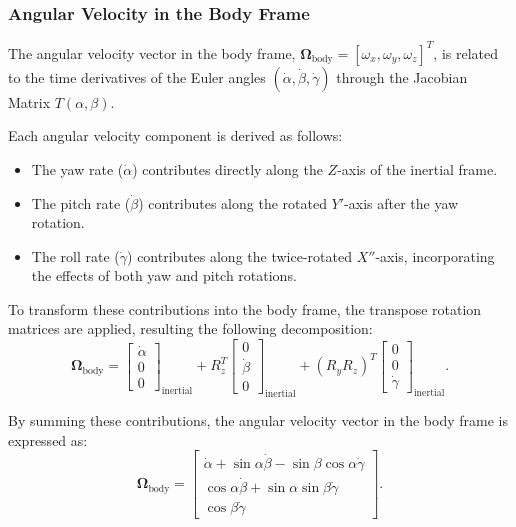 \documentclass[12pt]{article}
\begin{document}
\subsubsection{Angular Velocity in the Body Frame}

The angular velocity vector in the body frame, \(\boldsymbol{\Omega}_{\text{body}} = [\omega_x, \omega_y, \omega_z]^T\), is related to the time derivatives of the Euler angles \((\dot{\alpha}, \dot{\beta}, \dot{\gamma})\) through the Jacobian Matrix \(T(\alpha, \beta)\). 

Each angular velocity component is derived as follows:
\begin{itemize}
    \item The yaw rate (\(\dot{\alpha}\)) contributes directly along the \(Z\)-axis of the inertial frame.
    \item The pitch rate (\(\dot{\beta}\)) contributes along the rotated \(Y'\)-axis after the yaw rotation.
    \item The roll rate (\(\dot{\gamma}\)) contributes along the twice-rotated \(X''\)-axis, incorporating the effects of both yaw and pitch rotations.
\end{itemize}

To transform these contributions into the body frame, the transpose rotation matrices are applied, resulting the following decomposition:
\begin{equation}
\label{eq:omega_body_decomposition}
\boldsymbol{\Omega}_{\text{body}} =
\begin{bmatrix}
\dot{\alpha} \\
0 \\
0
\end{bmatrix}_{\text{inertial}}
+ R_z^T
\begin{bmatrix}
0 \\
\dot{\beta} \\
0
\end{bmatrix}_{\text{inertial}}
+ (R_y R_z)^T
\begin{bmatrix}
0 \\
0 \\
\dot{\gamma}
\end{bmatrix}_{\text{inertial}}.
\end{equation}

By summing these contributions, the angular velocity vector in the body frame is expressed as:
\begin{equation}
\label{eq:omega_body_expanded}
\boldsymbol{\Omega}_{\text{body}} =
\begin{bmatrix}
\dot{\alpha} + \sin\alpha \dot{\beta} - \sin\beta \cos\alpha \dot{\gamma} \\
\cos\alpha \dot{\beta} + \sin\alpha \sin\beta \dot{\gamma} \\
\cos\beta \dot{\gamma}
\end{bmatrix}.
\end{equation}
\end{document}
